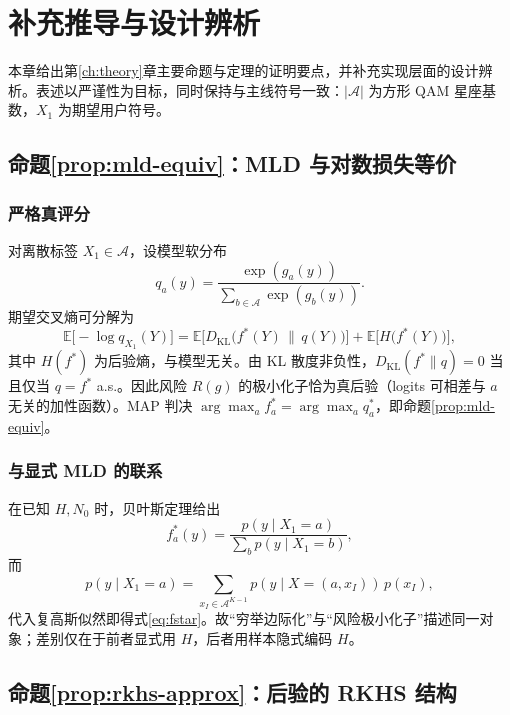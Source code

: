 \chapter{补充推导与设计辨析}
\label{ch:deriv}

本章给出第\ref{ch:theory}章主要命题与定理的证明要点，并补充实现层面的设计辨析。表述以严谨性为目标，同时保持与主线符号一致：$|\mathcal{A}|$ 为方形 QAM 星座基数，$X_1$ 为期望用户符号。

\section{命题\ref{prop:mld-equiv}：MLD 与对数损失等价}

\subsection{严格真评分}
对离散标签 $X_1\in\mathcal{A}$，设模型软分布
\begin{equation}
q_a(y)=\frac{\exp(g_a(y))}{\sum_{b\in\mathcal{A}}\exp(g_b(y))}.
\end{equation}
期望交叉熵可分解为
\begin{equation}
\mathbb{E}\big[-\log q_{X_1}(Y)\big]
=\mathbb{E}\big[D_{\mathrm{KL}}\big(f^*(Y)\,\|\,q(Y)\big)\big]
+\mathbb{E}\big[H\big(f^*(Y)\big)\big],
\label{eq:ce-decomp}
\end{equation}
其中 $H(f^*)$ 为后验熵，与模型无关。由 KL 散度非负性，$D_{\mathrm{KL}}(f^*\|q)=0$ 当且仅当 $q=f^*$ a.s.。因此风险 $R(g)$ 的极小化子恰为真后验（logits 可相差与 $a$ 无关的加性函数）。MAP 判决 $\arg\max_a f_a^*=\arg\max_a q_a^*$，即命题\ref{prop:mld-equiv}。

\subsection{与显式 MLD 的联系}
在已知 $H,N_0$ 时，贝叶斯定理给出
\begin{equation}
f_a^*(y)=\frac{p(y\mid X_1=a)}{\sum_b p(y\mid X_1=b)},
\end{equation}
而
\begin{equation}
p(y\mid X_1=a)
=\sum_{x_I\in\mathcal{A}^{K-1}}
p(y\mid X=(a,x_I))\,p(x_I),
\end{equation}
代入复高斯似然即得式\eqref{eq:fstar}。故“穷举边际化”与“风险极小化子”描述同一对象；差别仅在于前者显式用 $H$，后者用样本隐式编码 $H$。

\section{命题\ref{prop:rkhs-approx}：后验的 RKHS 结构}

